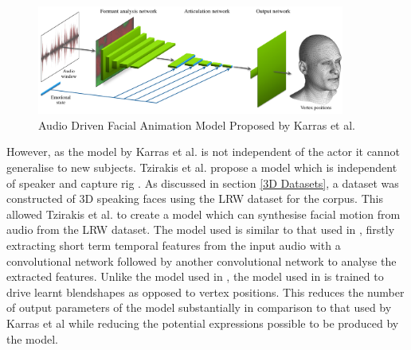 \documentclass[12pt]{report}
\begin{document}
\begin{figure}[h]
    \centering
        \includegraphics[width=0.9\textwidth]{figures/karras_model.png}
    \caption{Audio Driven Facial Animation Model Proposed by Karras et al. \cite{Karras2017a}}\label{fig:Karras_Model}
\end{figure}

However, as the model by Karras et al. is not independent of the actor it cannot generalise to new subjects.
Tzirakis et al. propose a model which is independent of speaker and capture rig \cite{Tzirakis2019}.
As discussed in section \ref{3D Datasets}, a dataset was constructed of 3D speaking faces using the LRW dataset \cite{Chung2016} for the corpus.
This allowed Tzirakis et al. to create a model which can synthesise facial motion from audio from the LRW dataset.
The model used is similar to that used in \cite{Karras2017a}, firstly extracting short term temporal features from the input audio with a convolutional network followed by another convolutional network to analyse the extracted features.
Unlike the model used in \cite{Karras2017a}, the model used in \cite{Tzirakis2019} is trained to drive learnt blendshapes as opposed to vertex positions.
This reduces the number of output parameters of the model substantially in comparison to that used by Karras et al while reducing the potential expressions possible to be produced by the model.
\end{document}
